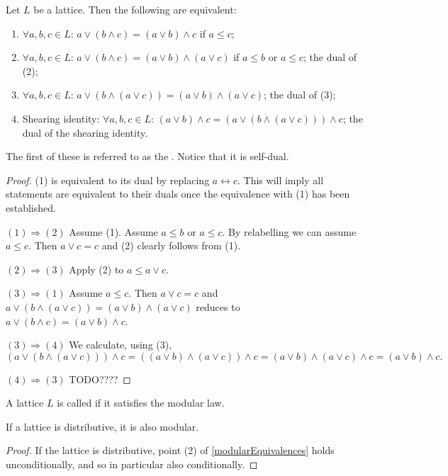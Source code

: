 \begin{proposition} \label{modularEquivalences}
Let $L$ be a lattice. Then the following are equivalent:
\begin{enumerate}
\item $\forall a,b,c\in L$: $a \vee (b\wedge c) = (a\vee b) \wedge c$ if $a\leq c$;
\item $\forall a,b,c\in L$: $a \vee (b\wedge c) = (a\vee b) \wedge (a\vee c)$ if $a\leq b$ or $a\leq c$; the dual of (2);
\item $\forall a,b,c\in L$: $a\vee (b\wedge (a\vee c)) = (a\vee b)\wedge (a\vee c)$; the dual of (3);
\item \textup{Shearing identity}: $\forall a,b,c\in L$: $(a\vee b) \wedge c = (a\vee (b\wedge (a\vee c)))\wedge c$; the dual of the shearing identity.
\end{enumerate}
\end{proposition}
The first of these is referred to as the . Notice that it is self-dual.
\begin{proof}
(1) is equivalent to its dual by replacing $a\leftrightarrow c$. This will imply all statements are equivalent to their duals once the equivalence with (1) has been established. 

$\boxed{(1)\Rightarrow (2)}$ Assume (1). Assume $a\leq b$ or $a\leq c$. By relabelling we can assume $a\leq c$.  Then $a\vee c = c$ and (2) clearly follows from (1).


$\boxed{(2)\Rightarrow (3)}$ Apply (2) to $a\leq a\vee c$.

$\boxed{(3)\Rightarrow (1)}$ Assume $a\leq c$. Then $a\vee c = c$ and $a\vee (b\wedge (a\vee c)) = (a\vee b)\wedge (a\vee c)$ reduces to $a \vee (b\wedge c) = (a\vee b) \wedge c$.

$\boxed{(3)\Rightarrow (4)}$ We calculate, using (3),
\[ (a\vee (b\wedge (a\vee c)))\wedge c = ((a\vee b)\wedge (a\vee c))\wedge c = (a\vee b) \wedge (a\vee c) \wedge c = (a\vee b) \wedge c. \]

$\boxed{(4)\Rightarrow (3)}$ TODO????
\end{proof}

\begin{definition}
A lattice $L$ is called  if it satisfies the modular law.
\end{definition}

\begin{lemma}
If a lattice is distributive, it is also modular.
\end{lemma}
\begin{proof}
If the lattice is distributive, point (2) of \ref{modularEquivalences} holds unconditionally, and so in particular also conditionally.
\end{proof}


